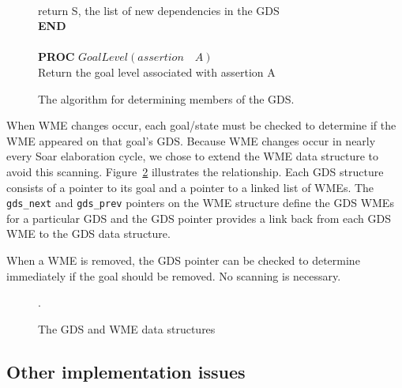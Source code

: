 \begin{figure}[h]
{\begin{minipage}{\textwidth}
\begin{tabbing}
\\
\> return S, the list of new dependencies in the GDS \\ 
\textbf{END} \\



\\
\textbf{PROC} $GoalLevel(assertion \quad A)$ \\
\> Return the goal level associated with assertion A

\end{tabbing}
\end{minipage}
}
\caption{The algorithm for determining members of the GDS.}
\label{tab:dhj:proc}
\end{figure}


When WME changes occur, each goal/state must be checked to determine
if the WME appeared on that goal's GDS. Because WME changes occur in
nearly every Soar elaboration cycle, we chose to extend the WME data
structure to avoid this scanning.  Figure~\ref{wme} illustrates the
relationship.  Each GDS structure consists of a pointer to its goal and a
pointer to a linked list of WMEs.  The \verb+gds_next+ and \verb+gds_prev+ pointers on
the WME structure define the GDS WMEs for a particular GDS and the GDS pointer
provides a link back from each GDS WME to the GDS data structure.

When a WME is removed, the GDS pointer can be checked to determine
immediately if the goal should be removed.  No scanning is necessary.


\begin{figure}
\caption{The GDS and WME data structures}.
\label{wme}
\end{figure}

\subsection*{Other implementation issues}

